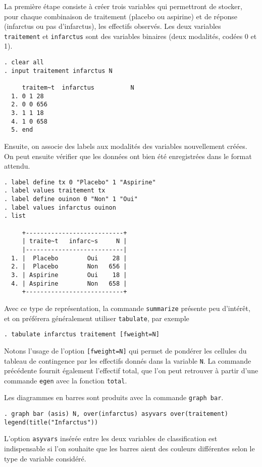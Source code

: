 La première étape consiste à créer trois variables qui permettront de
stocker, pour chaque combinaison de traitement (placebo ou aspirine) et de
réponse (infarctus ou pas d'infarctus), les effectifs observés. Les deux
variables \texttt{traitement} et \texttt{infarctus} sont des variables
binaires (deux modalités, codées 0 et 1). 
\begin{verbatim}
. clear all
. input traitement infarctus N

     traitem~t  infarctus          N
  1. 0 1 28
  2. 0 0 656
  3. 1 1 18
  4. 1 0 658
  5. end
\end{verbatim}
Ensuite, on associe des labels aux modalités des variables nouvellement
créées. On peut ensuite vérifier que les données ont bien été enregistrées
dans le format attendu.
\begin{verbatim}
. label define tx 0 "Placebo" 1 "Aspirine"
. label values traitement tx
. label define ouinon 0 "Non" 1 "Oui"
. label values infarctus ouinon
. list

     +---------------------------+
     | traite~t   infarc~s     N |
     |---------------------------|
  1. |  Placebo        Oui    28 |
  2. |  Placebo        Non   656 |
  3. | Aspirine        Oui    18 |
  4. | Aspirine        Non   658 |
     +---------------------------+
\end{verbatim}

Avec ce type de représentation, la commande \texttt{summarize} présente peu
d'intérêt, et on préférera généralement utiliser \texttt{tabulate}, par
exemple 
\begin{verbatim}
. tabulate infarctus traitement [fweight=N]
\end{verbatim}
Notons l'usage de l'option \verb|[fweight=N]| qui permet de pondérer les
cellules du tableau de contingence par les effectifs donnés dans la variable
\texttt{N}. La commande précédente fournit également l'effectif total, que
l'on peut retrouver à partir d'une commande \texttt{egen} avec la fonction
\texttt{total}. 

Les diagrammes en barres sont produits avec la commande \verb|graph bar|.
\begin{verbatim}
. graph bar (asis) N, over(infarctus) asyvars over(traitement) legend(title("Infarctus"))
\end{verbatim}
L'option \texttt{asyvars} insérée entre les deux variables de classification
est indispensable si l'on souhaite que les barres aient des couleurs
différentes selon le type de variable considéré. 


